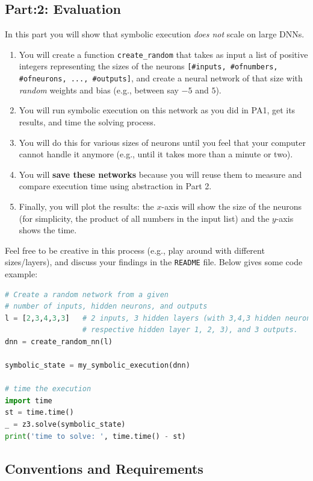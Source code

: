 \subsection{Part:2: Evaluation}
In this part you will show that symbolic execution \emph{does not} scale on large DNNs.

\begin{enumerate}
    \item You will create a function \texttt{create\_random} that takes as input a list of positive integers representing the sizes of the neurons \texttt{[\#inputs, \#ofnumbers, \#ofneurons, ..., \#outputs]}, and create a neural network of that size with \emph{random} weights and bias (e.g., between say $-5$ and $5$).
    \item You will run symbolic execution on this network as you did in PA1, get its results, and time the solving process.
    \item You will do this for various sizes of neurons until you feel that your computer cannot handle it anymore (e.g., until it takes more than a minute or two).
    \item You will \textbf{save these networks} because you will reuse them to measure and compare execution time using abstraction in Part 2.
    \item Finally, you will plot the results: the $x$-axis will show the size of the neurons (for simplicity, the product of all numbers in the input list) and the $y$-axis shows the time.
\end{enumerate}

Feel free to be creative in this process (e.g., play around with different sizes/layers), and discuss your findings in the \texttt{README} file. Below gives some code example:

\begin{lstlisting}[language=Python]
# Create a random network from a given 
# number of inputs, hidden neurons, and outputs
l = [2,3,4,3,3]   # 2 inputs, 3 hidden layers (with 3,4,3 hidden neurons for 
                  # respective hidden layer 1, 2, 3), and 3 outputs.
dnn = create_random_nn(l)

symbolic_state = my_symbolic_execution(dnn)

# time the execution
import time
st = time.time()
_ = z3.solve(symbolic_state)
print('time to solve: ', time.time() - st)
\end{lstlisting}

\subsection{Conventions and Requirements}

